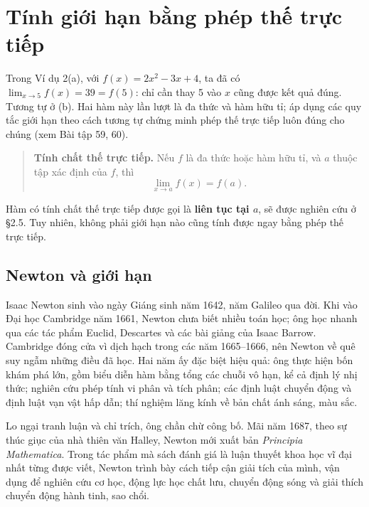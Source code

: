 \documentclass[12pt,a4paper]{article}
\begin{document}
\section*{Tính giới hạn bằng phép thế trực tiếp}
Trong Ví dụ 2(a), với $f(x)=2x^2-3x+4$, ta đã có $\lim_{x\to5}f(x)=39=f(5)$: chỉ cần thay 5 vào $x$ cũng được kết quả đúng. Tương tự ở (b). Hai hàm này lần lượt là đa thức và hàm hữu tỉ; áp dụng các quy tắc giới hạn theo cách tương tự chứng minh phép thế trực tiếp luôn đúng cho chúng (xem Bài tập 59, 60).
\begin{quote}\textbf{Tính chất thế trực tiếp.} Nếu $f$ là đa thức hoặc hàm hữu tỉ, và $a$ thuộc tập xác định của $f$, thì
\[\lim_{x\to a}f(x)=f(a).\]
\end{quote}
Hàm có tính chất thế trực tiếp được gọi là \textbf{liên tục tại $a$}, sẽ được nghiên cứu ở §2.5. Tuy nhiên, không phải giới hạn nào cũng tính được ngay bằng phép thế trực tiếp.
\subsection*{Newton và giới hạn}
Isaac Newton sinh vào ngày Giáng sinh năm 1642, năm Galileo qua đời. Khi vào Đại học Cambridge năm 1661, Newton chưa biết nhiều toán học; ông học nhanh qua các tác phẩm Euclid, Descartes và các bài giảng của Isaac Barrow. Cambridge đóng cửa vì dịch hạch trong các năm 1665–1666, nên Newton về quê suy ngẫm những điều đã học. Hai năm ấy đặc biệt hiệu quả: ông thực hiện bốn khám phá lớn, gồm biểu diễn hàm bằng tổng các chuỗi vô hạn, kể cả định lý nhị thức; nghiên cứu phép tính vi phân và tích phân; các định luật chuyển động và định luật vạn vật hấp dẫn; thí nghiệm lăng kính về bản chất ánh sáng, màu sắc.

Lo ngại tranh luận và chỉ trích, ông chần chừ công bố. Mãi năm 1687, theo sự thúc giục của nhà thiên văn Halley, Newton mới xuất bản \textit{Principia Mathematica}. Trong tác phẩm mà sách đánh giá là luận thuyết khoa học vĩ đại nhất từng được viết, Newton trình bày cách tiếp cận giải tích của mình, vận dụng để nghiên cứu cơ học, động lực học chất lưu, chuyển động sóng và giải thích chuyển động hành tinh, sao chổi.
\end{document}
